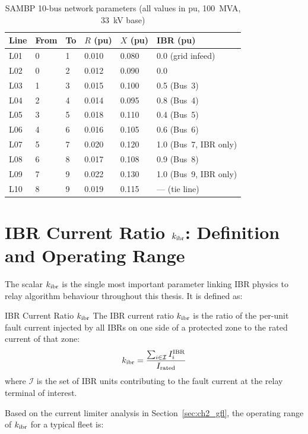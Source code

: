 \begin{table}[htbp]
\caption{SAMBP 10-bus network parameters (all values in pu, 100~MVA, 33~kV base)}
\label{tab:ch2_network_params}
\small
\begin{tabularx}{\textwidth}{@{}lXXXXX@{}}
\toprule
Line & From & To & $R$ (pu) & $X$ (pu) & IBR (pu) \\
\midrule
L01 & 0 & 1 & 0.010 & 0.080 & 0.0 (grid infeed) \\
L02 & 0 & 2 & 0.012 & 0.090 & 0.0 \\
L03 & 1 & 3 & 0.015 & 0.100 & 0.5 (Bus~3) \\
L04 & 2 & 4 & 0.014 & 0.095 & 0.8 (Bus~4) \\
L05 & 3 & 5 & 0.018 & 0.110 & 0.4 (Bus~5) \\
L06 & 4 & 6 & 0.016 & 0.105 & 0.6 (Bus~6) \\
L07 & 5 & 7 & 0.020 & 0.120 & 1.0 (Bus~7, IBR only) \\
L08 & 6 & 8 & 0.017 & 0.108 & 0.9 (Bus~8) \\
L09 & 7 & 9 & 0.022 & 0.130 & 1.0 (Bus~9, IBR only) \\
L10 & 8 & 9 & 0.019 & 0.115 & — (tie line) \\
\bottomrule
\end{tabularx}
\end{table}

\section{IBR Current Ratio \texorpdfstring{$k_{\mathrm{ibr}}$}{k\_ibr}: Definition and Operating Range}
\label{sec:ch2_kibr}

The scalar $k_{\mathrm{ibr}}$ is the single most important parameter linking IBR
physics to relay algorithm behaviour throughout this thesis. It is defined as:

\begin{thesisdef}{IBR Current Ratio $k_{\mathrm{ibr}}$}
The IBR current ratio $k_{\mathrm{ibr}}$ is the ratio of the per-unit fault current
injected by all IBRs on one side of a protected zone to the rated current
of that zone:
\begin{equation}
  k_{\mathrm{ibr}} = \frac{\sum_{i \in \mathcal{I}} I_i^\mathrm{IBR}}{I_\mathrm{rated}}
  \label{eq:ch2_kibr_formal}
\end{equation}
where $\mathcal{I}$ is the set of IBR units contributing to the fault current
at the relay terminal of interest.
\end{thesisdef}

Based on the current limiter analysis in Section~\ref{sec:ch2_gfl},
the operating range of $k_{\mathrm{ibr}}$ for a typical fleet is:

